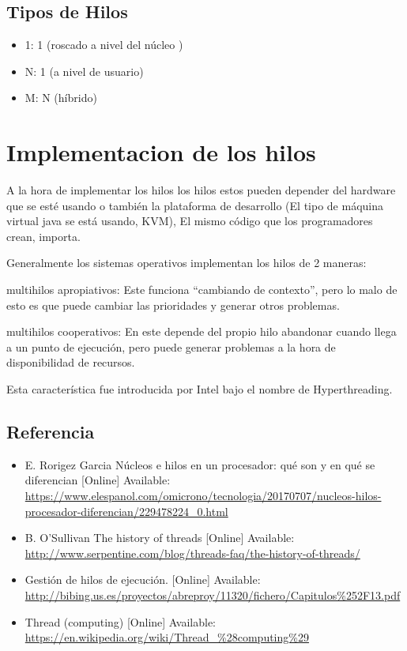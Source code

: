 \documentclass[11pt]{article}
\begin{document}
\subsection*{Tipos de Hilos}
\begin{itemize}
    \item 1: 1 (roscado a nivel del núcleo )
    \item N: 1 (a nivel de usuario)
    \item M: N (híbrido)
\end{itemize}
\section*{Implementacion de los hilos}
A la hora de implementar los hilos los hilos estos pueden depender del hardware que se esté usando o también la plataforma de desarrollo (El tipo de máquina virtual java se está usando, KVM), El mismo código que los programadores crean, importa.

Generalmente los sistemas operativos implementan los hilos de 2 maneras:

multihilos apropiativos: Este funciona “cambiando de contexto”, pero lo malo de esto es que puede cambiar las prioridades y generar otros problemas.

multihilos cooperativos: En este depende del propio hilo abandonar cuando llega a un punto de ejecución, pero puede generar problemas a la hora de disponibilidad de recursos. 

Esta característica fue introducida por Intel bajo el nombre de Hyperthreading.
%
\subsection*{Referencia}


%
\begin{itemize}
    \item E. Rorigez Garcia  Núcleos e hilos en un procesador: qué son y en qué se diferencian [Online] Available: \url{https://www.elespanol.com/omicrono/tecnologia/20170707/nucleos-hilos-procesador-diferencian/229478224_0.html}
    \item B. O’Sullivan The history of threads [Online] Available: \url{http://www.serpentine.com/blog/threads-faq/the-history-of-threads/}
    \item Gestión de hilos de ejecución. [Online] Available: \url{http://bibing.us.es/proyectos/abreproy/11320/fichero/Capitulos%252F13.pdf}
    \item Thread (computing) [Online] Available: \url{https://en.wikipedia.org/wiki/Thread_%28computing%29}

\end{itemize}
\end{document}

